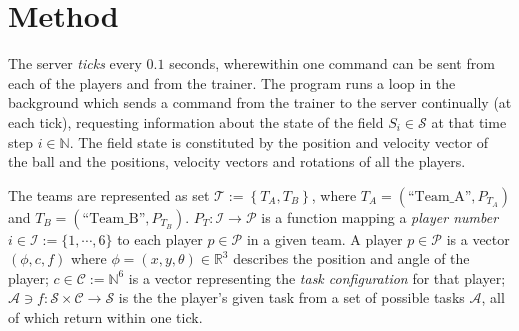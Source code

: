 \documentclass[10pt,a4paper]{article}
\begin{document}
\section{Method}

The server \textit{ticks} every \(0.1\) seconds, wherewithin one command can be sent from each of the players and from the trainer. The program runs a loop in the background which sends a command from the trainer to the server continually (at each tick), requesting information about the state of the field \(S_i \in \mathcal{S}\) at that time step \(i \in \mathbb{N}\). The field state is constituted by the position and velocity vector of the ball and the positions, velocity vectors and rotations of all the players.

The teams are represented as set \(\mathcal{T} := \left\{ T_A, T_B \right\}\), where \(T_A = (\text{``Team\_A''}, P_{T_A})\) and \(T_B = (\text{``Team\_B''}, P_{T_B})\). \(P_T : \mathcal{I} \to \mathcal{P} \) is a function mapping a \textit{player number} \(i\in \mathcal{I} := \{1,\cdots,6\}\) to each player \(p \in \mathcal{P}\) in a given team. A player \(p\in \mathcal{P}\) is a vector \((\phi, c, f)\) where \(\phi = (x, y, \theta) \in \mathbb{R}^3\) describes the position and angle of the player; \(c \in \mathcal{C} := \mathbb{N}^6\) is a vector representing the \textit{task configuration} for that player; \(\mathcal{A} \ni f : \mathcal{S}\times \mathcal{C} \to \mathcal{S}\) is the the player's given task from a set of possible tasks \(\mathcal{A}\), all of which return within one tick.%
\end{document}
